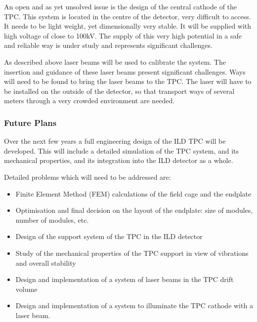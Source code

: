 An open and as yet unsolved issue is the design of the central cathode of the TPC. This system is located in the centre of the detector, very difficult to access. It needs to be light weight, yet dimensionally very stable. It will be supplied with high voltage of close to \unit{100}{kV}. The supply of this very high potential in a safe and reliable way is under study and represents significant challenges.

As described above laser beams will be used to calibrate the system. The insertion and guidance of these laser beams present significant challenges. Ways will need to be found to bring the laser beams to the TPC. The laser will have to be installed on the outside of the detector, so that transport ways of several meters through a very crowded environment are needed.

\subsubsection{Future Plans}
Over the next few years a full engineering design of the ILD TPC will be developed. This will include a detailed simulation of the TPC system, and its mechanical properties, and its integration into the ILD detector as a whole.

Detailed problems which will need to be addressed are:

\begin{itemize}
\item Finite Element Method (FEM) calculations of the field cage and the endplate
\item Optimisation and final decision on the layout of the endplate: size of modules, number of modules, etc.
\item Design of the support system of the TPC in the ILD detector
\item Study of the mechanical properties of the TPC support in view of vibrations and overall stability
\item Design and implementation of a system of laser beams in the TPC drift volume
\item Design and implementation of a system to illuminate the TPC cathode with a laser beam.
\end{itemize}



